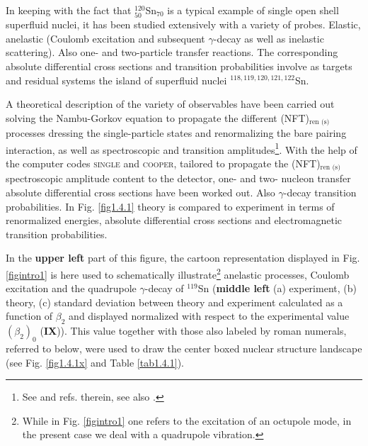 In keeping with the fact that $^{120}_{50}$Sn$_{70}$ is a 
 typical example of single open shell superfluid nuclei, it has been studied extensively with a variety of probes.  Elastic, anelastic (Coulomb excitation and subsequent $\gamma$-decay as well as inelastic scattering). Also one- and two-particle transfer reactions. The corresponding absolute differential cross sections and transition probabilities  involve as targets and residual systems the island of superfluid nuclei $^{118,119,120,121,122}$Sn.
 
 
  A theoretical description of the variety of observables  have been carried out  solving the Nambu-Gorkov equation to propagate the different  (NFT)$_{\text{ren (s)}}$ processes dressing the single-particle states and renormalizing the bare pairing interaction, as well as spectroscopic and transition amplitudes\footnote{See \cite{Idini:15} and refs. therein, see also \cite{Broglia:16}.}. With the help of the computer codes \textsc{single} and \textsc{cooper}, tailored to propagate the (NFT)$_{\text{ren (s)}}$ spectroscopic amplitude content to the detector, one- and two- nucleon transfer absolute differential cross sections have been worked out. Also  $\gamma$-decay transition probabilities. In Fig. \ref{fig1.4.1} theory is compared to experiment in terms of renormalized energies, absolute differential cross sections and electromagnetic transition probabilities. 
  
  
In the \textbf{upper left} part of this figure, the cartoon representation displayed in Fig. \ref{figintro1} is here used to schematically illustrate\footnote{While in Fig. \ref{figintro1} one refers to the excitation of an octupole mode, in the present case we deal with a quadrupole vibration.}  anelastic processes, Coulomb excitation and the quadrupole $\gamma$-decay of $^{119}$Sn (\textbf{middle left} (a) experiment, (b) theory, (c) standard deviation between theory and experiment calculated as a function of $\beta_2$ and displayed normalized with respect to the experimental value $(\beta_2)_0$ (\textbf{IX})). This   value together with those also labeled by roman numerals, referred to below, were used to draw the center boxed nuclear structure landscape (see Fig. \ref{fig1.4.1x} and Table \ref{tab1.4.1}).   
  
